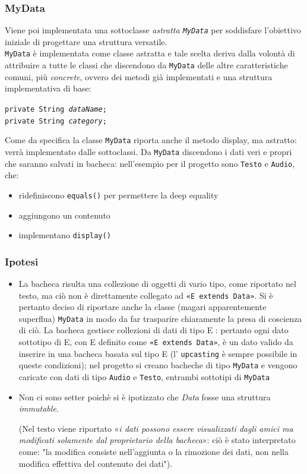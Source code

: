 \documentclass[10pt, a4paper]{article}
\begin{document}
\subsubsection{MyData}
Viene poi implementata una sottoclasse \textit{astratta \texttt{MyData}} per soddisfare l'obiettivo iniziale di progettare una struttura versatile.\\
\texttt{MyData} è implementata come classe astratta e tale scelta deriva dalla volontà di attribuire a tutte le classi che discendono da \texttt{MyData} delle altre caratteristiche comuni, più \textit{concrete}, ovvero dei metodi già implementati e una struttura implementativa di base:
\begin{center}
	\texttt{private String \emph{dataName};\\
	private String \emph{category};\\}
\end{center}
Come da specifica la classe \texttt{MyData} riporta anche il metodo display, ma astratto: verrà implementato dalle sottoclassi.
Da \texttt{MyData} discendono i dati veri e propri che saranno salvati in bacheca: nell'esempio per il progetto sono \texttt{Testo} e \texttt{Audio}, che:
\begin{itemize}
	\item ridefiniscono \texttt{equals()} per permettere la deep equality
	\item aggiungono un contenuto
	\item implementano \texttt{display()}
\end{itemize}

\subsubsection{Ipotesi}
\begin{itemize}
	\item La bacheca risulta una collezione di oggetti di vario tipo, come riportato nel testo, ma ciò non è direttamente collegato ad \texttt{«E extends Data»}. Si è pertanto deciso di riportare anche la classe (magari apparentemente superflua) \texttt{MyData} in modo da far trasparire chiaramente la presa di coscienza di ciò. La bacheca gestisce collezioni di dati di tipo E : pertanto ogni dato sottotipo di E, con E definito come \texttt{«E extends Data»}, è un dato valido da inserire in una bacheca basata sul tipo E (l' \texttt{upcasting} è sempre possibile in queste condizioni); nel progetto si creano bacheche di tipo \texttt{MyData} e vengono caricate con dati di tipo \texttt{Audio} e \texttt{Testo}, entrambi sottotipi di \texttt{MyData}
	\item Non ci sono setter poichè si è ipotizzato che \textit{Data} fosse una struttura \textit{immutable}.\\
	\begin{footnotesize}
(Nel testo viene riportato «\textit{i dati possono essere
visualizzati dagli amici ma modificati solamente dal proprietario della bacheca}»: ciò è stato interpretato come: "la modifica consiste nell'aggiunta o la rimozione dei dati, non nella  modifica effettiva del contenuto dei dati").
\end{footnotesize}
 \end{itemize}
 
\end{document}
